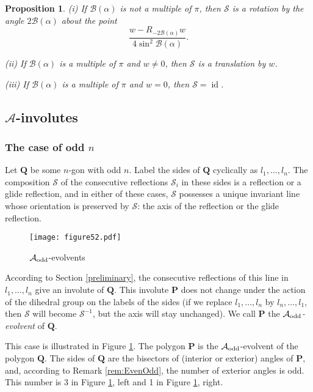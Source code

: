 \documentclass[12pt]{article}
\newtheorem{proposition}[lemma]{Proposition}
\newcommand{\B}{\mathcal{B}}
\newcommand{\Aev}{\mathcal{A}}
\renewcommand{\P}{\mathbf{P}}
\newcommand{\id}{\operatorname{id}}
\begin{document}
\begin{proposition} {\rm (i)} If $\B(\alpha)$ is not a multiple of $\pi$, then $\mathcal S$ is a rotation by the angle $2\B(\alpha)$ about the point 
$$
\frac{w-R_{-2\B(\alpha)}w}{4 \sin^2\B(\alpha)}.
$$ 

{\rm(ii)} If $\B(\alpha)$ is a multiple of $\pi$ and $w\ne0$, then $\mathcal S$ is a translation by $w$.

{\rm(iii)} If $\B(\alpha)$ is a multiple of $\pi$ and $w=0$, then $\mathcal S=\id$.
\end{proposition}

\subsection{$\Aev$-involutes}\label{Ainv}

\subsubsection{The case of odd $n$}\label{Ainvodd}

Let $\mathbf Q$ be some $n$-gon with  odd $n$. Label the sides of $\mathbf Q$ cyclically as $l_1,\dots,l_n$. The composition $\mathcal S$ of the consecutive reflections ${\mathcal S}_i$  in these sides is a reflection or a glide reflection, and in either of these cases, $\mathcal S$ possesses a unique invariant line whose orientation is preserved by $\mathcal S$: the axis of the reflection or the glide reflection. 

\begin{figure}[htbp]
\centering
\texttt{[image: figure52.pdf]}
\caption{$\Aev_{\rm odd}$-evolvents}
\label{anglevolodd}
\end{figure}

According to Section \ref{preliminary}, the consecutive reflections of this line in $l_1,\dots,l_n$ give an involute of $\mathbf Q$. This involute $\P$ does not change under the action of the dihedral group on the labels of the sides (if we replace $l_1,\dots,l_n$ by $l_n,\dots,l_1$, then $\mathcal S$ will become ${\mathcal S}^{-1}$, but the axis will stay unchanged). We call $\P$ the {\it $\Aev_{\rm odd}$-evolvent} of $\mathbf Q$. 

This case is illustrated in Figure \ref{anglevolodd}. The polygon $\P$ is the $\Aev_{\rm odd}$-evolvent of the polygon $\mathbf Q$.  The sides of $\mathbf Q$ are the bisectors of (interior or exterior) angles of $\P$, and, according to Remark \ref{rem:EvenOdd}, the number of exterior angles is odd. This number is 3 in Figure \ref{anglevolodd}, left and 1 in Figure \ref{anglevolodd}, right.
\end{document}
